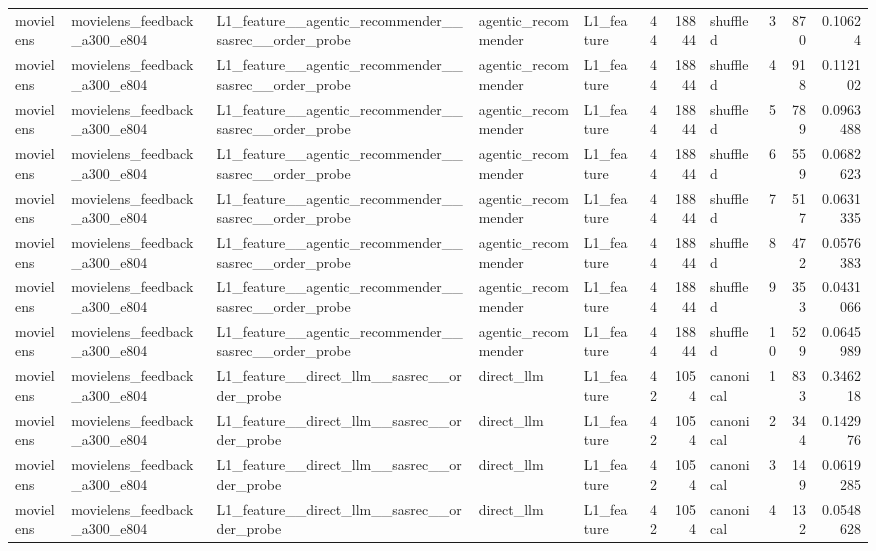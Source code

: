 \begin{table}[htbp!]
\begin{tabular}{lllllrrlrrr}
movielens & movielens\_feedback\_a300\_e804 & L1\_feature\_\_agentic\_recommender\_\_sasrec\_\_order\_probe & agentic\_recommender & L1\_feature & 44 & 18844 & shuffled & 3 & 870 & 0.10624 \\
movielens & movielens\_feedback\_a300\_e804 & L1\_feature\_\_agentic\_recommender\_\_sasrec\_\_order\_probe & agentic\_recommender & L1\_feature & 44 & 18844 & shuffled & 4 & 918 & 0.112102 \\
movielens & movielens\_feedback\_a300\_e804 & L1\_feature\_\_agentic\_recommender\_\_sasrec\_\_order\_probe & agentic\_recommender & L1\_feature & 44 & 18844 & shuffled & 5 & 789 & 0.0963488 \\
movielens & movielens\_feedback\_a300\_e804 & L1\_feature\_\_agentic\_recommender\_\_sasrec\_\_order\_probe & agentic\_recommender & L1\_feature & 44 & 18844 & shuffled & 6 & 559 & 0.0682623 \\
movielens & movielens\_feedback\_a300\_e804 & L1\_feature\_\_agentic\_recommender\_\_sasrec\_\_order\_probe & agentic\_recommender & L1\_feature & 44 & 18844 & shuffled & 7 & 517 & 0.0631335 \\
movielens & movielens\_feedback\_a300\_e804 & L1\_feature\_\_agentic\_recommender\_\_sasrec\_\_order\_probe & agentic\_recommender & L1\_feature & 44 & 18844 & shuffled & 8 & 472 & 0.0576383 \\
movielens & movielens\_feedback\_a300\_e804 & L1\_feature\_\_agentic\_recommender\_\_sasrec\_\_order\_probe & agentic\_recommender & L1\_feature & 44 & 18844 & shuffled & 9 & 353 & 0.0431066 \\
movielens & movielens\_feedback\_a300\_e804 & L1\_feature\_\_agentic\_recommender\_\_sasrec\_\_order\_probe & agentic\_recommender & L1\_feature & 44 & 18844 & shuffled & 10 & 529 & 0.0645989 \\
movielens & movielens\_feedback\_a300\_e804 & L1\_feature\_\_direct\_llm\_\_sasrec\_\_order\_probe & direct\_llm & L1\_feature & 42 & 1054 & canonical & 1 & 833 & 0.346218 \\
movielens & movielens\_feedback\_a300\_e804 & L1\_feature\_\_direct\_llm\_\_sasrec\_\_order\_probe & direct\_llm & L1\_feature & 42 & 1054 & canonical & 2 & 344 & 0.142976 \\
movielens & movielens\_feedback\_a300\_e804 & L1\_feature\_\_direct\_llm\_\_sasrec\_\_order\_probe & direct\_llm & L1\_feature & 42 & 1054 & canonical & 3 & 149 & 0.0619285 \\
movielens & movielens\_feedback\_a300\_e804 & L1\_feature\_\_direct\_llm\_\_sasrec\_\_order\_probe & direct\_llm & L1\_feature & 42 & 1054 & canonical & 4 & 132 & 0.0548628 \\

\end{tabular}
\end{table}
